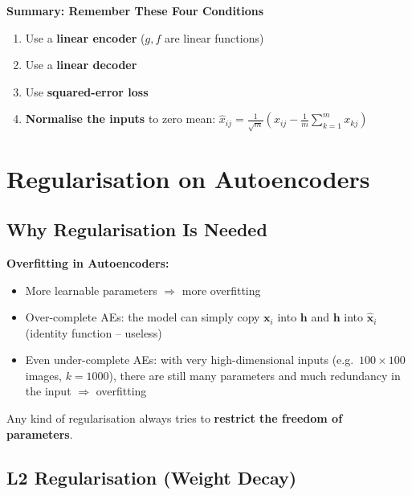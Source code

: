 \documentclass[12pt,a4paper]{article}
\newcommand{\vx}{\mathbf{x}}
\newcommand{\vh}{\mathbf{h}}
\newcommand{\hatx}{\hat{\mathbf{x}}}
\begin{document}
\begin{notebox}
\textbf{Summary: Remember These Four Conditions}
\begin{enumerate}
  \item Use a \textbf{linear encoder} ($g,f$ are linear functions)
  \item Use a \textbf{linear decoder}
  \item Use \textbf{squared-error loss}
  \item \textbf{Normalise the inputs} to zero mean: $\hat{x}_{ij} = \frac{1}{\sqrt{m}}\left(x_{ij} - \frac{1}{m}\sum_{k=1}^{m}x_{kj}\right)$
\end{enumerate}
\end{notebox}

\section{Regularisation on Autoencoders}

\subsection{Why Regularisation Is Needed}

\begin{alertbox}
\textbf{Overfitting in Autoencoders:}
\begin{itemize}
  \item More learnable parameters $\Rightarrow$ more overfitting
  \item Over-complete AEs: the model can simply copy $\vx_i$ into $\vh$ and $\vh$ into $\hatx_i$ (identity function -- useless)
  \item Even under-complete AEs: with very high-dimensional inputs (e.g.\ $100\times100$ images, $k=1000$), there are still many parameters and much redundancy in the input $\Rightarrow$ overfitting
\end{itemize}
Any kind of regularisation always tries to \textbf{restrict the freedom of parameters}.
\end{alertbox}

\subsection{L2 Regularisation (Weight Decay)}
\end{document}
